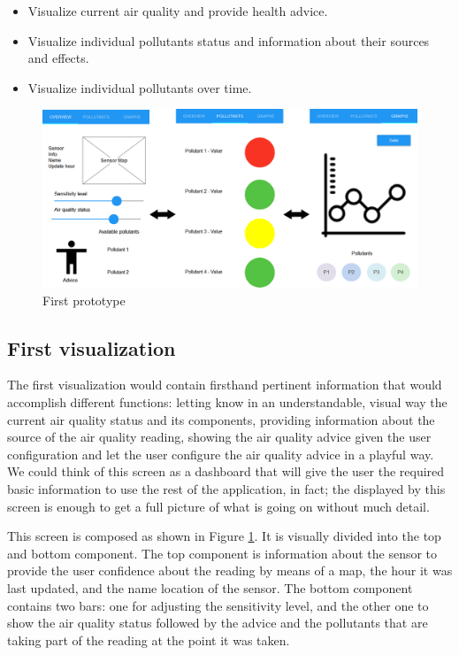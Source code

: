 \begin{itemize}
	\item Visualize current air quality and provide health advice.
    \item Visualize individual pollutants status and information about their sources and effects.
    \item Visualize individual pollutants over time.
\end{itemize}


\begin{figure}[H]
\begin{adjustbox}{width=1.2\textwidth,center=\textwidth}
  \centering
  \includegraphics[scale=1]{images/firstPrototype.png}
\end{adjustbox}
  \caption[Frist prototype]{First prototype}
  \label{fig:first_visualization_first_prototype}
\end{figure}


\subsection{First visualization}

The first visualization would contain firsthand pertinent information that would accomplish different functions: letting know in an understandable, visual way the current air quality status and its components, providing information about the source of the air quality reading, showing the air quality advice given the user configuration and let the user configure the air quality advice in a playful way. We could think of this screen as a dashboard that will give the user the required basic information to use the rest of the application, in fact; the displayed by this screen is enough to get a full picture of what is going on without much detail.

This screen is composed as shown in Figure \ref{fig:first_visualization_first_prototype}. It is visually divided into the top and bottom component. The top component is information about the sensor to provide the user confidence about the reading by means of a map, the hour it was last updated, and the name location of the sensor. The bottom component contains two bars: one for adjusting the sensitivity level, and the other one to show the air quality status followed by the advice and the pollutants that are taking part of the reading at the point it was taken. 

